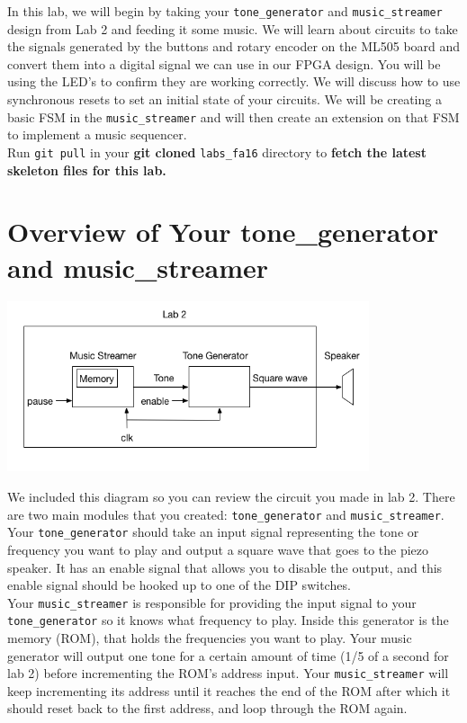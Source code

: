 \documentclass[11pt]{article}
\begin{document}
In this lab, we will begin by taking your \verb|tone_generator| and \verb|music_streamer| design from Lab 2 and feeding it some music. We will learn about circuits to take the signals generated by the buttons and rotary encoder on the ML505 board and convert them into a digital signal we can use in our FPGA design. You will be using the LED's to confirm they are working correctly. We will discuss how to use synchronous resets to set an initial state of your circuits. We will be creating a basic FSM in the \verb|music_streamer| and will then create an extension on that FSM to implement a music sequencer. \\

Run \verb|git pull| in your \textbf{git cloned} \verb|labs_fa16| directory to \textbf{fetch the latest skeleton files for this lab.}

\section{Overview of Your tone\_generator and music\_streamer}

\begin{center}
\includegraphics[height=5cm]{images/lab2_fig1.png}
\end{center}

We included this diagram so you can review the circuit you made in lab 2. There are two main modules that you created: \verb|tone_generator| and \verb|music_streamer|. \\

Your \verb|tone_generator| should take an input signal representing the tone or frequency you want to play and output a square wave that goes to the piezo speaker. It has an enable signal that allows you to disable the output, and this enable signal should be hooked up to one of the DIP switches.  \\

Your \verb|music_streamer| is responsible for providing the input signal to your \verb|tone_generator| so it knows what frequency to play. Inside this generator is the memory (ROM), that holds the frequencies you want to play. Your music generator will output one tone for a certain amount of time (1/5 of a second for lab 2) before incrementing the ROM's address input. Your \verb|music_streamer| will keep incrementing its address until it reaches the end of the ROM after which it should reset back to the first address, and loop through the ROM again.
\end{document}

